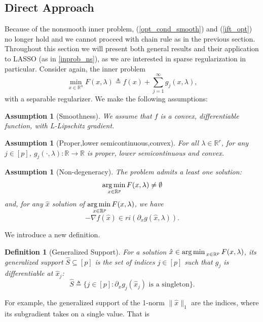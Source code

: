 \documentclass[11pt, twoside]{report}
\newtheorem{definition}[theorem]{Definition}
\newtheorem{assumption}[theorem]{Assumption}
\begin{document}
\subsection{Direct Approach}
\label{section: bertrand}
Because of the nonsmooth inner problem, (\ref{opt_cond_smooth}) and (\ref{ift_opt}) no longer hold and we cannot proceed with chain rule as in the previous section. Throughout this section we will present both general results and their application to LASSO (as in \ref{inprob_ns}), as we are interested in sparse regularization in particular. Consider again, the inner problem
\begin{equation*} \label{regular_sep}
    \min _{x \in \mathbb{R}^n} F(x,\lambda) \triangleq f(x) + \sum_{j=1}^\infty g_j(x,\lambda),
\end{equation*}
with a separable regularizer. We make the following assumptions:
\begin{assumption}[Smoothness]
\label{smooth_a}
    We assume that $f$ is a convex, differentiable function, with L-Lipschitz gradient.
\end{assumption}
\begin{assumption}[Proper,lower semicontinuous,convex]
\label{pcc_a}
    For all $\lambda \in \mathbb{R}^r$, for any $j \in [p]$, $g_j(\cdot,\lambda): \mathbb{R} \xrightarrow[]{} \mathbb{R}$ is proper, lower semicontinuous and convex.
\end{assumption}
\begin{assumption}[Non-degeneracy]
\label{nondeg_a}
The problem admits a least one solution:
    \begin{equation*}
        \underset{x \in \mathbb{R}^p} {\operatorname*{arg\, min \,}} F(x,\lambda) \neq \emptyset
    \end{equation*}
    and, for any $\hat{x}$ solution of $\underset{x \in \mathbb{R}^p} {\operatorname*{arg\, min \,}} F(x,\lambda)$, we have
    \[-\nabla f(\hat{x}) \in ri\left(\partial_x g(\hat{x},\lambda)\right).\]
\end{assumption}
We introduce a new definition.
\begin{definition}[Generalized Support]
For a solution $\hat{x} \in \operatorname*{arg\, min \,}_{x \in \mathbb{R}^p} F(x,\lambda)$, its generalized support $\hat{S} \subseteq [p]$ is the set of indices $j \in [p]$ such that $g_j$ is differentiable at $\hat{x}_j$:
    \[\hat{S} \triangleq \{j \in [p]: \partial_x g_j(\hat{x}_j) \text{ is a singleton}\}.\]
\end{definition}
For example, the generalized support of the 1-norm $\|\hat{x}\|_1$ are the indices, where its subgradient takes on a single value. That is
\end{document}
